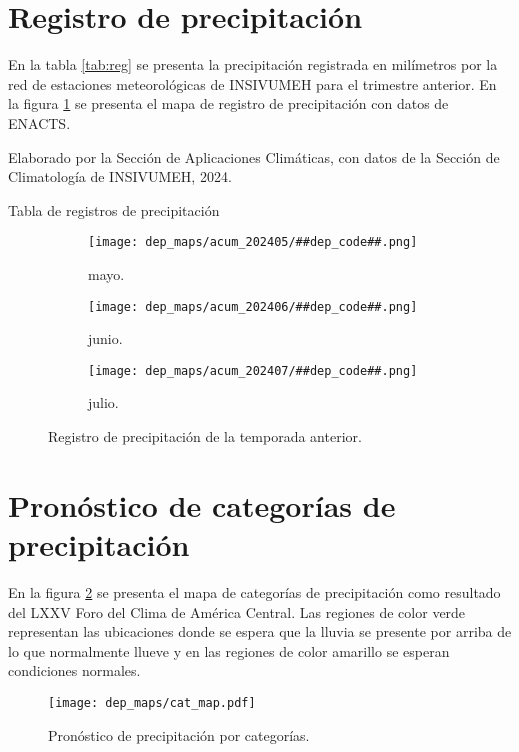 \section*{Registro de precipitación}
En la tabla \ref{tab:reg} se presenta la precipitación registrada en milímetros por la red de estaciones meteorológicas de INSIVUMEH para el trimestre anterior.
En la figura \ref{fig:reg} se presenta el mapa de registro de precipitación con datos de ENACTS.


\begin{table}[H]
    
    \caption*{\footnotesize{Elaborado por la Sección de Aplicaciones Climáticas, con datos de la Sección de Climatología de INSIVUMEH, 2024.}}
    \caption{Tabla de registros de precipitación}
    \label{tab:reg}
\end{table}
\begin{figure}[H]
    \centering
    \begin{subfigure}{0.45\linewidth}
        \centering
        \texttt{[image: dep\_maps/acum\_202405/\#\#dep\_code\#\#.png]}
        \caption{mayo.}
    \end{subfigure}
    \begin{subfigure}{0.45\linewidth}
        \centering
        \texttt{[image: dep\_maps/acum\_202406/\#\#dep\_code\#\#.png]}
        \caption{junio.}
    \end{subfigure}
    \begin{subfigure}{0.45\linewidth}
        \centering
        \texttt{[image: dep\_maps/acum\_202407/\#\#dep\_code\#\#.png]}
        \caption{julio.}
    \end{subfigure}
    \caption{Registro de precipitación de la temporada anterior.}
    \label{fig:reg}
\end{figure}

\pagebreak

\section*{Pronóstico de categorías de precipitación}
En la figura \ref{fig:cat} se presenta el mapa de categorías de precipitación como resultado del LXXV Foro del Clima de América Central. Las regiones de color verde representan las ubicaciones donde se espera que la lluvia se presente por arriba de lo que normalmente llueve y en las regiones de color amarillo se esperan condiciones normales.
\begin{figure}[H]
    \centering
    \texttt{[image: dep\_maps/cat\_map.pdf]}
    \caption{Pronóstico de precipitación por categorías.}
    \label{fig:cat}
\end{figure}
% 


